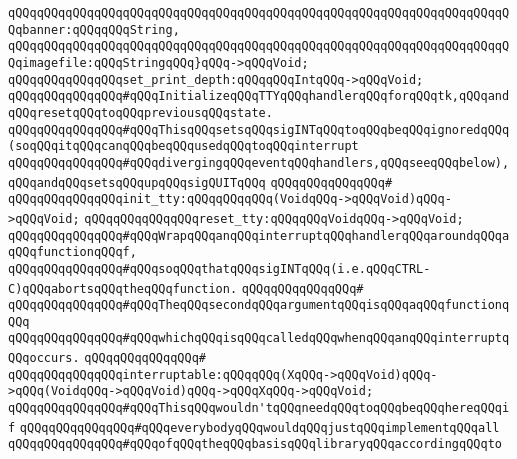\verb|qQQqqQQqqQQqqQQqqQQqqQQqqQQqqQQqqQQqqQQqqQQqqQQqqQQqqQQqqQQqqQQqqQQqqQQqbanner:qQQqqQQqString,|\newline
\verb|qQQqqQQqqQQqqQQqqQQqqQQqqQQqqQQqqQQqqQQqqQQqqQQqqQQqqQQqqQQqqQQqqQQqqQQqimagefile:qQQqStringqQQq}qQQq->qQQqVoid;|\newline
\newline
\verb|qQQqqQQqqQQqqQQqset_print_depth:qQQqqQQqIntqQQq->qQQqVoid;|\newline
\newline
\verb|qQQqqQQqqQQqqQQq#qQQqInitializeqQQqTTYqQQqhandlerqQQqforqQQqtk,qQQqandqQQqresetqQQqtoqQQqpreviousqQQqstate.|\newline
\verb|qQQqqQQqqQQqqQQq#qQQqThisqQQqsetsqQQqsigINTqQQqtoqQQqbeqQQqignoredqQQq(soqQQqitqQQqcanqQQqbeqQQqusedqQQqtoqQQqinterrupt|\newline
\verb|qQQqqQQqqQQqqQQq#qQQqdivergingqQQqeventqQQqhandlers,qQQqseeqQQqbelow),qQQqandqQQqsetsqQQqupqQQqsigQUITqQQq|\newline
\verb|qQQqqQQqqQQqqQQq#|\newline
\verb|qQQqqQQqqQQqqQQqinit_tty:qQQqqQQqqQQq(VoidqQQq->qQQqVoid)qQQq->qQQqVoid;|\newline
\verb|qQQqqQQqqQQqqQQqreset_tty:qQQqqQQqVoidqQQq->qQQqVoid;|\newline
\newline
\verb|qQQqqQQqqQQqqQQq#qQQqWrapqQQqanqQQqinterruptqQQqhandlerqQQqaroundqQQqaqQQqfunctionqQQqf,|\newline
\verb|qQQqqQQqqQQqqQQq#qQQqsoqQQqthatqQQqsigINTqQQq(i.e.qQQqCTRL-C)qQQqabortsqQQqtheqQQqfunction.|\newline
\verb|qQQqqQQqqQQqqQQq#|\newline
\verb|qQQqqQQqqQQqqQQq#qQQqTheqQQqsecondqQQqargumentqQQqisqQQqaqQQqfunctionqQQq|\newline
\verb|qQQqqQQqqQQqqQQq#qQQqwhichqQQqisqQQqcalledqQQqwhenqQQqanqQQqinterruptqQQqoccurs.|\newline
\verb|qQQqqQQqqQQqqQQq#|\newline
\verb|qQQqqQQqqQQqqQQqinterruptable:qQQqqQQq(XqQQq->qQQqVoid)qQQq->qQQq(VoidqQQq->qQQqVoid)qQQq->qQQqXqQQq->qQQqVoid;|\newline
\newline
\verb|qQQqqQQqqQQqqQQq#qQQqThisqQQqwouldn'tqQQqneedqQQqtoqQQqbeqQQqhereqQQqif|\newline
\verb|qQQqqQQqqQQqqQQq#qQQqeverybodyqQQqwouldqQQqjustqQQqimplementqQQqall|\newline
\verb|qQQqqQQqqQQqqQQq#qQQqofqQQqtheqQQqbasisqQQqlibraryqQQqaccordingqQQqto|\newline

